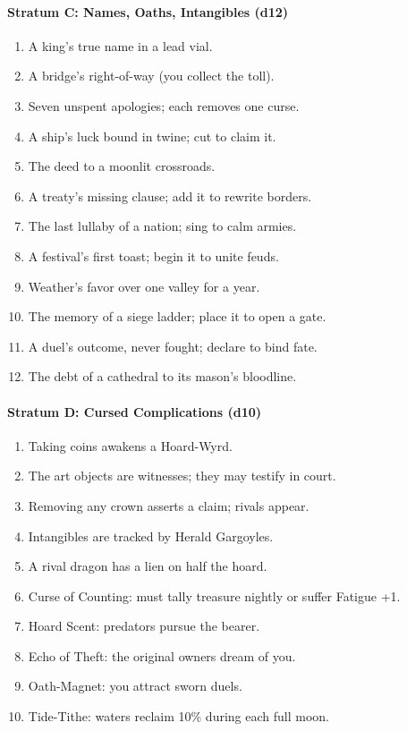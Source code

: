 \paragraph{Stratum C: Names, Oaths, Intangibles (d12)}
\begin{enumerate}
    \item A king's true name in a lead vial.
    \item A bridge's right-of-way (you collect the toll).
    \item Seven unspent apologies; each removes one curse.
    \item A ship's luck bound in twine; cut to claim it.
    \item The deed to a moonlit crossroads.
    \item A treaty's missing clause; add it to rewrite borders.
    \item The last lullaby of a nation; sing to calm armies.
    \item A festival's first toast; begin it to unite feuds.
    \item Weather's favor over one valley for a year.
    \item The memory of a siege ladder; place it to open a gate.
    \item A duel's outcome, never fought; declare to bind fate.
    \item The debt of a cathedral to its mason's bloodline.
\end{enumerate}

\paragraph{Stratum D: Cursed Complications (d10)}
\begin{enumerate}
    \item Taking coins awakens a Hoard-Wyrd.
    \item The art objects are witnesses; they may testify in court.
    \item Removing any crown asserts a claim; rivals appear.
    \item Intangibles are tracked by Herald Gargoyles.
    \item A rival dragon has a lien on half the hoard.
    \item Curse of Counting: must tally treasure nightly or suffer Fatigue +1.
    \item Hoard Scent: predators pursue the bearer.
    \item Echo of Theft: the original owners dream of you.
    \item Oath-Magnet: you attract sworn duels.
    \item Tide-Tithe: waters reclaim 10\% during each full moon.
\end{enumerate}

